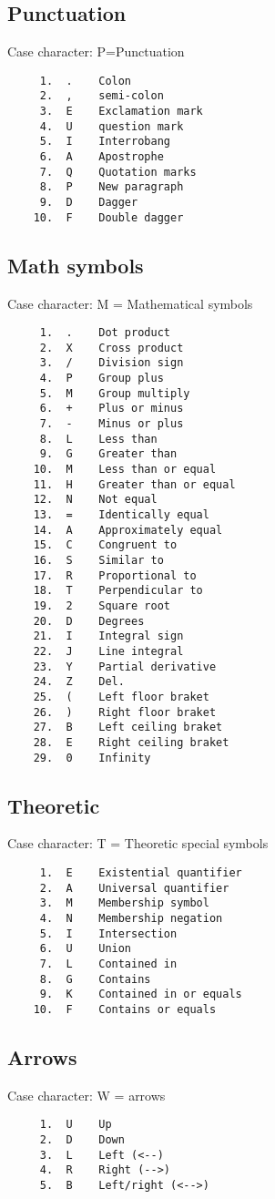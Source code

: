 \subsection{Punctuation}
Case character:  
P=Punctuation 
\begin{verbatim}
     1.  .    Colon 
     2.  ,    semi-colon 
     3.  E    Exclamation mark 
     4.  U    question mark 
     5.  I    Interrobang 
     6.  A    Apostrophe 
     7.  Q    Quotation marks 
     8.  P    New paragraph 
     9.  D    Dagger 
    10.  F    Double dagger 
\end{verbatim}
\subsection{Math symbols}
Case character:  
M = Mathematical symbols 
\begin{verbatim}
     1.  .    Dot product 
     2.  X    Cross product 
     3.  /    Division sign 
     4.  P    Group plus 
     5.  M    Group multiply 
     6.  +    Plus or minus 
     7.  -    Minus or plus 
     8.  L    Less than 
     9.  G    Greater than 
    10.  M    Less than or equal 
    11.  H    Greater than or equal 
    12.  N    Not equal 
    13.  =    Identically equal 
    14.  A    Approximately equal 
    15.  C    Congruent to 
    16.  S    Similar to 
    17.  R    Proportional to 
    18.  T    Perpendicular to 
    19.  2    Square root 
    20.  D    Degrees 
    21.  I    Integral sign 
    22.  J    Line integral 
    23.  Y    Partial derivative 
    24.  Z    Del.  
    25.  (    Left floor braket 
    26.  )    Right floor braket 
    27.  B    Left ceiling braket 
    28.  E    Right ceiling braket 
    29.  0    Infinity 
\end{verbatim}
\subsection{Theoretic}
Case character:  
T = Theoretic special symbols 
\begin{verbatim}
     1.  E    Existential quantifier 
     2.  A    Universal quantifier 
     3.  M    Membership symbol 
     4.  N    Membership negation 
     5.  I    Intersection 
     6.  U    Union 
     7.  L    Contained in 
     8.  G    Contains 
     9.  K    Contained in or equals 
    10.  F    Contains or equals 
\end{verbatim}
\subsection{Arrows}
Case character:  
W = arrows 
\begin{verbatim}
     1.  U    Up 
     2.  D    Down 
     3.  L    Left (<--) 
     4.  R    Right (-->) 
     5.  B    Left/right (<-->) 
\end{verbatim}
